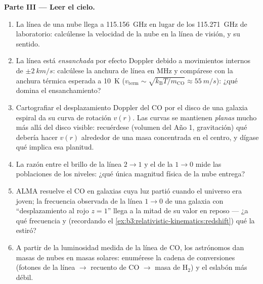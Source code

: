 \begin{problem}
\medskip\noindent\textbf{Parte III --- Leer el cielo.}
\begin{enumerate}[resume]
  \item La línea de una nube llega a \qty{115.156}{GHz} en lugar de los
        \qty{115.271}{GHz} de laboratorio: calcúlense la velocidad de la
        nube en la línea de visión, y su sentido.
  \item La línea está \emph{ensanchada} por efecto Doppler debido a
        movimientos internos de $\pm\qty{2}{km/s}$: calcúlese la anchura de línea en
        MHz y compárese con la anchura térmica esperada a \qty{10}{K}
        ($v_{\text{term}} \sim \sqrt{k_{\text{B}}T/m_{\text{CO}}}
        \approx \qty{55}{m/s}$): ¿qué domina el ensanchamiento?
  \item Cartografiar el desplazamiento Doppler del CO por el disco de una
        galaxia espiral da su curva de rotación $v(r)$. Las curvas se
        mantienen \emph{planas} mucho más allá del disco visible:
        recuérdese (volumen del Año 1, gravitación) qué debería hacer
        $v(r)$ alrededor de una masa concentrada en el centro, y dígase
        qué implica esa planitud.
  \item La razón entre el brillo de la línea $2\to1$ y el de la
        $1\to0$ mide las poblaciones de los niveles: ¿qué única magnitud
        física de la nube entrega?
  \item ALMA resuelve el CO en galaxias cuya luz partió cuando el
        universo era joven; la frecuencia observada de la línea
        $1 \to 0$ de una galaxia con ``desplazamiento al rojo $z = 1$''
        llega a la mitad de su valor en reposo --- ¿a qué frecuencia y
        (recordando el \cref{ex:b3:relativistic-kinematics:redshift})
        qué la estiró?
  \item A partir de la luminosidad medida de la línea de CO, los
        astrónomos dan masas de nubes en masas solares: enumérese la
        cadena de conversiones (fotones de la línea $\to$ recuento de CO
        $\to$ masa de H$_2$) y el eslabón más débil.
\end{enumerate}


\end{problem}
